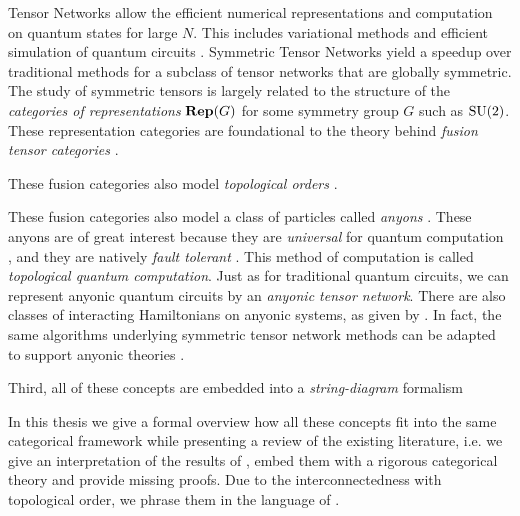 Tensor Networks \cite{cuiperHouchesLectureNotes2026} allow the efficient
numerical representations and computation on quantum states for large $N$. This
includes variational methods and efficient simulation of quantum circuits
\cite{orusAdvancesTensorNetwork2014,biamonteLecturesQuantumTensor2020}.
Symmetric Tensor Networks \cite{singhTensorNetworkDecompositions2010a} yield a
speedup over traditional methods for a subclass of tensor networks that are
globally symmetric. The study of symmetric tensors is largely related to the
structure of the \emph{categories of representations} $\mathbf{Rep}(G)$ for some
symmetry group $G$ such as $\mathrm{SU}(2)$. These representation categories are
foundational to the theory behind \emph{fusion tensor categories}
\cite{deligneCategoriesTensorielles2002}.

These fusion categories also model \emph{topological orders} . 

These fusion categories also model a class of particles  called \emph{anyons} \cite{kitaevAnyonsExactlySolved2006}.
These anyons are of great interest because they are \emph{universal} for quantum
computation \cite{freedmanSimulationTopologicalField2002}, and they are natively
\emph{fault tolerant} \cite{kitaevFaulttolerantQuantumComputation2003}. This
method of computation is called \emph{topological quantum computation}. Just as
for traditional quantum circuits, we can represent anyonic quantum circuits by
an \emph{anyonic tensor network}. There are also classes of interacting
Hamiltonians on anyonic systems, as given by
\cite{feiguinInteractingAnyonsTopological2007}. In fact, the same algorithms
underlying symmetric tensor network methods can be adapted to support anyonic
theories
\cite{pfeiferSimulationAnyonsUsing2012,schmollProgrammingGuideTensor2020,devosTensorKitjlJuliaPackage2025}. 

Third, all of these concepts are embedded into a \emph{string-diagram} formalism
\cite{}


In this thesis we give a formal overview how all these concepts fit into the same
categorical framework while presenting a review of the existing literature, i.e. we give
an interpretation of the results of
\textcite{singhTensorNetworkStates2012a,weichselbaumTensorNetworksNumerical2012,pfeiferSimulationAnyonsTensor2010,dissertation,devosTensorKitjlJuliaPackage2025}%
, embed them with a rigorous categorical theory and provide missing proofs. Due
to the interconnectedness with topological order, we phrase them in the language
of \cite{kongInvitationTopologicalOrders2022b}. 

